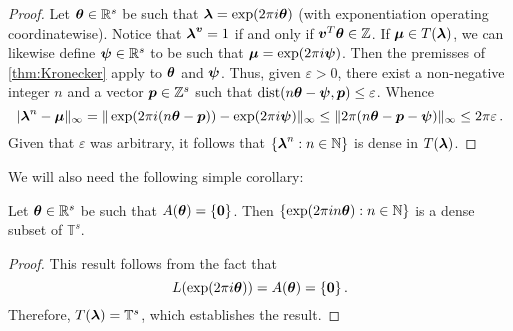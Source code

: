 \begin{proof}
Let $\boldsymbol{\theta} \in \mathbb{R}^{s}$ be such that $\boldsymbol{\lambda} = \exp(2 \pi i \boldsymbol{\theta})$ (with exponentiation operating coordinatewise). Notice that $\boldsymbol{\lambda}^{\boldsymbol{v}} = 1$ if and only if $\boldsymbol{v}^{T} \boldsymbol{\theta} \in \mathbb{Z}$.
If $\boldsymbol{\mu} \in T(\boldsymbol{\lambda})$, we can likewise define $\boldsymbol{\psi} \in \mathbb{R}^{s}$ to be such that $\boldsymbol{\mu}=\exp(2 \pi i \boldsymbol{\psi})$. Then the premisses of \cref{thm:Kronecker} apply to $\boldsymbol{\theta}$ and $\boldsymbol{\psi}$.
Thus, given $\varepsilon>0$, there exist a non-negative integer $n$ and a vector $\boldsymbol{p} \in \mathbb{Z}^{s}$ such that $\operatorname{dist}(n \boldsymbol{\theta} - \boldsymbol{\psi}, \boldsymbol{p}) \leq \varepsilon$.
Whence
\begin{equation*}
  | \boldsymbol{\lambda}^{n}-\boldsymbol{\mu} \|_{\infty} = \| \exp( 2 \pi i (n\boldsymbol{\theta} - \boldsymbol{p})) - \exp(2 \pi i \boldsymbol{\psi}) \|_{\infty} \leq \| 2 \pi (n\boldsymbol{\theta} -\boldsymbol{p} - \boldsymbol{\psi}) \|_\infty \leq 2 \pi \varepsilon \, .
\end{equation*}
Given that $\varepsilon$ was arbitrary, it follows that $\lbrace \boldsymbol{\lambda}^{n} : n \in \mathbb{N} \rbrace$ is dense in $T(\boldsymbol{\lambda})$.
\end{proof}

We will also need the following simple corollary:
\begin{corollary}
  Let $\boldsymbol{\theta} \in \mathbb{R}^{s}$ be such that $A(\boldsymbol{\theta}) = \lbrace \boldsymbol{0} \rbrace$. Then $\lbrace \exp(2 \pi i n \boldsymbol{\theta}) : n \in \mathbb{N} \rbrace$ is a dense subset of $\mathbb{T}^s$.
\label{corl:kronecker}
\end{corollary}
\begin{proof}
This result follows from the fact that
\begin{equation*}
  L(\exp(2 \pi i \boldsymbol{\theta})) = A(\boldsymbol{\theta}) = \lbrace \boldsymbol{0} \rbrace \, .
\end{equation*}
Therefore, $T(\boldsymbol{\lambda}) = \mathbb{T}^{s}$, which establishes the result.
\end{proof}
